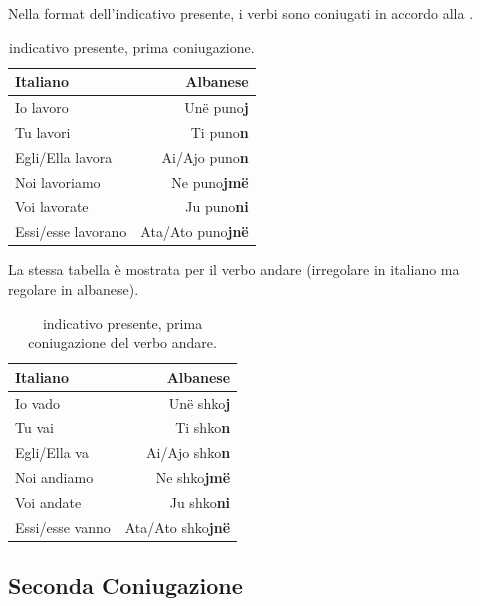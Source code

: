 Nella format dell'indicativo presente, i verbi sono coniugati in accordo alla .

\begin{table}[ht]
    \centering
    \begin{tabular}{lr}
        \toprule
        Italiano    &   Albanese\\
        \midrule
        Io lavoro           &   Unë puno\textbf{j} \\
        Tu lavori           &   Ti puno\textbf{n} \\
        Egli/Ella lavora    &   Ai/Ajo puno\textbf{n} \\
        Noi lavoriamo       &   Ne puno\textbf{jmë} \\
        Voi lavorate        &   Ju puno\textbf{ni} \\
        Essi/esse lavorano  &   Ata/Ato puno\textbf{jnë} \\
        \bottomrule
    \end{tabular}
    \caption{indicativo presente, prima coniugazione.}
    \label{tbl:verb:primaconiugazione:indicativo:presente}
\end{table}

La stessa tabella è mostrata per il verbo andare (irregolare in italiano ma regolare in albanese).

\begin{table}[ht]
    \centering
    \begin{tabular}{lr}
        \toprule
        Italiano    &   Albanese\\
        \midrule
        Io vado           &   Unë shko\textbf{j} \\
        Tu vai           &   Ti shko\textbf{n} \\
        Egli/Ella va    &   Ai/Ajo shko\textbf{n} \\
        Noi andiamo       &   Ne shko\textbf{jmë} \\
        Voi andate        &   Ju shko\textbf{ni} \\
        Essi/esse vanno  &   Ata/Ato shko\textbf{jnë} \\
        \bottomrule
    \end{tabular}
    \caption{indicativo presente, prima coniugazione del verbo andare.}
    \label{tbl:verb:andare:primaconiugazione:indicativo:presente}
\end{table}

\subsection{Seconda Coniugazione}

